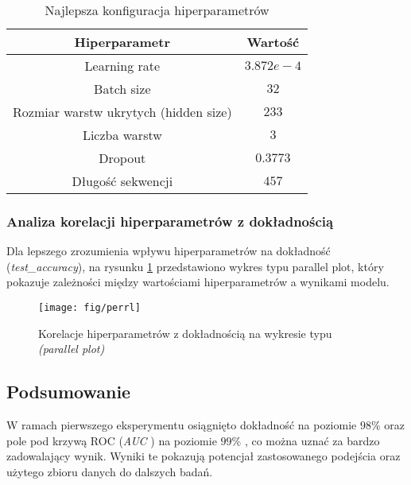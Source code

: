 \documentclass[eeg_v4.tex]{subfiles}
\begin{document}
    \begin{table}[h!]
        \centering
        \begin{tabular}{|c|c|}
            \hline
            \textbf{Hiperparametr}                & \textbf{Wartość} \\ \hline
            Learning rate                         & \(3.872e-4\)     \\ \hline
            Batch size                            & \(32\)           \\ \hline
            Rozmiar warstw ukrytych (hidden size) & \(233\)          \\ \hline
            Liczba warstw                         & \(3\)            \\ \hline
            Dropout                               & \(0.3773\)       \\ \hline
            Długość sekwencji                     & \(457\)          \\ \hline
        \end{tabular}
        \caption{Najlepsza konfiguracja hiperparametrów}
        \label{tab:best_params}
    \end{table}

    \subsubsection{Analiza korelacji hiperparametrów z dokładnością}
    Dla lepszego zrozumienia wpływu hiperparametrów na dokładność (\textit{test\_accuracy}), na rysunku
    \ref{fig:parallel_plot}
    przedstawiono wykres typu parallel plot, który pokazuje zależności między wartościami hiperparametrów a wynikami
    modelu.

    \begin{figure}[h!]
        \centering
        \texttt{[image: fig/perrl]}
        \caption{Korelacje hiperparametrów z dokładnością na wykresie typu \textit{(parallel plot)}}
        \label{fig:parallel_plot}
    \end{figure}

    \subsection{Podsumowanie}

    W ramach pierwszego eksperymentu osiągnięto dokładność na poziomie \(98\%\) oraz pole pod krzywą ROC (\textit{AUC}
    ) na poziomie \(99\%\)
    , co można uznać za bardzo zadowalający wynik. Wyniki te pokazują potencjał zastosowanego podejścia oraz użytego
    zbioru danych do dalszych badań.
\end{document}
